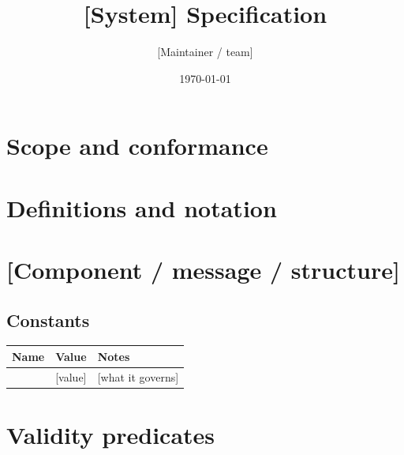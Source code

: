 \documentclass[11pt]{article}
\title{[System] Specification}
\author{[Maintainer / team]}
\date{\today}
\begin{document}
\maketitle
\tableofcontents

\section{Scope and conformance}

\section{Definitions and notation}

\section{[Component / message / structure]}

\subsection{Constants}
\begin{center}
\begin{tabular}{@{}lll@{}}
\toprule
Name & Value & Notes \\
\midrule
[CONST\_A] & [value] & [what it governs] \\
\bottomrule
\end{tabular}
\end{center}

\section{Validity predicates}
\end{document}
